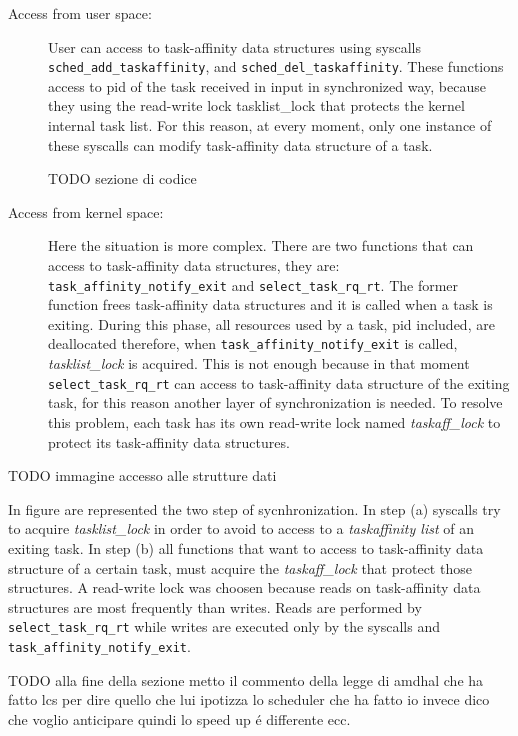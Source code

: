 \begin{description}

\item[Access from user space:] User can access to task-affinity data structures using syscalls \texttt{sched\_add\_taskaffinity}, and 
\texttt{sched\_del\_taskaffinity}. These functions access to pid of the task received in input in synchronized way, because they using the read-write lock
tasklist\_lock that protects the kernel internal task list. For this reason, at every moment, only one instance of these syscalls can modify task-affinity 
data structure of a task.

TODO sezione di codice

\item[Access from kernel space:] Here the situation is more complex. There are two functions that can access to task-affinity data structures, they are:
\texttt{task\_affinity\_notify\_exit} and \texttt{select\_task\_rq\_rt}. The former function frees task-affinity data structures and it is called when a 
task is exiting. During this phase, all resources used by a task, pid included, are deallocated therefore, when \texttt{task\_affinity\_notify\_exit} is 
called, \textit{tasklist\_lock} is acquired. This is not enough because in that moment \texttt{select\_task\_rq\_rt} can access to task-affinity data 
structure of the exiting task, for this reason another layer of synchronization is needed. To resolve this problem, each task has its own read-write lock 
named \textit{taskaff\_lock} to protect its task-affinity data structures. 

\end{description}

TODO immagine accesso alle strutture dati

In figure are represented the two step of sycnhronization. In step (a) syscalls try to acquire \textit{tasklist\_lock} in order to avoid to access to a 
\textit{taskaffinity list} of an exiting task. In step (b) all functions that want to access to task-affinity data structure of a certain task, must 
acquire the \textit{taskaff\_lock} that protect those structures. A read-write lock was choosen because reads on task-affinity data structures are 
most frequently than writes. Reads are performed by \texttt{select\_task\_rq\_rt} while writes are executed only by the syscalls and 
\texttt{task\_affinity\_notify\_exit}.


TODO  alla fine della sezione metto il commento della legge di amdhal che ha fatto lcs per dire quello che lui ipotizza lo scheduler che ha fatto
io invece dico che voglio anticipare quindi lo speed up \'e differente ecc.
